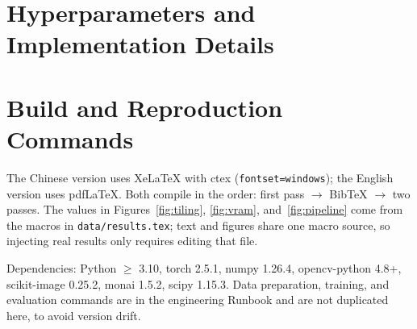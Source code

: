 \section{Hyperparameters and Implementation Details}\label{app:hyper}

\begin{table}[h]
\centering
\caption{Default training and inference configuration (single source: the engineering parameter schema).}
\label{tab:hyper}
\small
{}
\end{table}

\section{Build and Reproduction Commands}\label{app:build}

The Chinese version uses XeLaTeX with ctex (\texttt{fontset=windows}); the English version uses pdfLaTeX. Both compile in the order: first pass $\to$ BibTeX $\to$ two passes. The values in Figures~\ref{fig:tiling}, \ref{fig:vram}, and~\ref{fig:pipeline} come from the macros in \texttt{data/results.tex}; text and figures share one macro source, so injecting real results only requires editing that file.

Dependencies: Python $\ge$ 3.10, torch 2.5.1, numpy 1.26.4, opencv-python 4.8+, scikit-image 0.25.2, monai 1.5.2, scipy 1.15.3. Data preparation, training, and evaluation commands are in the engineering Runbook and are not duplicated here, to avoid version drift.
